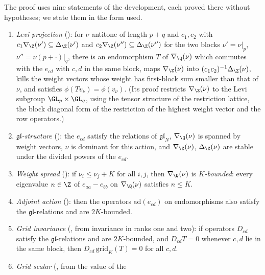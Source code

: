 The proof uses nine statements of the development, each proved there without hypotheses; we state them in the form used.
\begin{enumerate}[label=(W\arabic*)]
\item\label{pf:sh-div:W:levi} \emph{Levi projection} (): for
$\nu$ antitone of length $p+q$ and $c_1,c_2$ with $c_1\nabla_\Z(\nu')\subseteq\Delta_\Z(\nu')$ and $c_2\nabla_\Z(\nu'')\subseteq\Delta_\Z(\nu'')$ for
the two blocks $\nu'=\nu|_p$, $\nu''=\nu(p+\cdot)|_q$, there is an endomorphism $T$ of $\nabla_\Q(\nu)$ which commutes with the $e_{cd}$ with
$c,d$ in the same block, maps $\nabla_\Z(\nu)$ into $(c_1c_2)^{-1}\Delta_\Z(\nu)$, kills the weight vectors whose weight has first-block sum
smaller than that of $\nu$, and satisfies $\phi(Tv_\nu)=\phi(v_\nu)$. (Its proof restricts $\nabla_\Z(\nu)$ to the Levi subgroup
$\GL_p\times\GL_q$, using the tensor structure of the restriction lattice, the block diagonal form of the restriction of the highest
weight vector and the row operators.)
\item\label{pf:sh-div:W:gl} \emph{$\mathfrak{gl}$-structure} (): the $e_{cd}$ satisfy
the relations of $\mathfrak{gl}_N$, $\nabla_\Q(\nu)$ is spanned by weight vectors, $\nu$ is dominant for this action, and
$\nabla_\Z(\nu)$, $\Delta_\Z(\nu)$ are stable under the divided powers of the $e_{cd}$.
\item\label{pf:sh-div:W:bdd} \emph{Weight spread} (): if $\nu_i\le\nu_j+K$ for all
$i,j$, then $\nabla_\Q(\nu)$ is \emph{$K$-bounded}: every eigenvalue $n\in\Z$ of $e_{aa}-e_{bb}$ on $\nabla_\Q(\nu)$ satisfies $n\le K$.
\item\label{pf:sh-div:W:adj} \emph{Adjoint action} (): then the operators
$\mathrm{ad}(e_{cd})$ on endomorphisms also satisfy the $\mathfrak{gl}$-relations and are $2K$-bounded.
\item\label{pf:sh-div:W:inv} \emph{Grid invariance} (, from invariance in ranks one and
two): if operators $D_{cd}$ satisfy the $\mathfrak{gl}$-relations and are $2K$-bounded, and $D_{cd}T=0$ whenever $c,d$ lie in the same
block, then $D_{cd}\,\mathrm{grid}_K(T)=0$ for all $c,d$.
\item\label{pf:sh-div:W:sc} \emph{Grid scalar} (, from the value of the

\end{enumerate}
